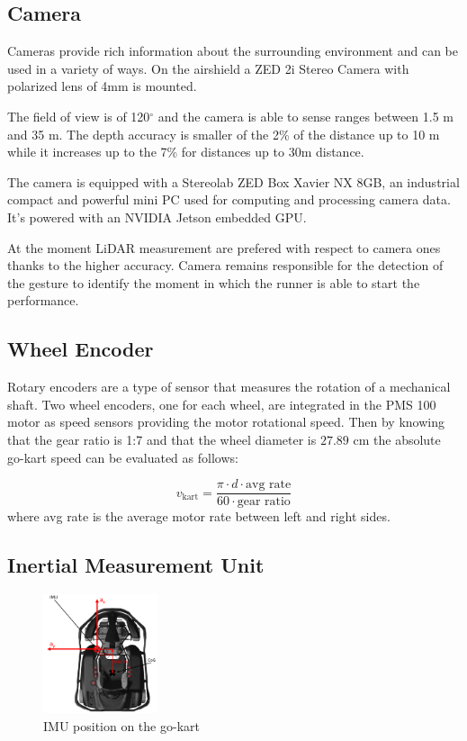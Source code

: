 \documentclass[a4paper,12pt,oneside]{book}
\begin{document}
\subsection*{Camera}
Cameras provide rich information about the surrounding environment and can be used in a variety of ways.
On the airshield a ZED 2i Stereo Camera with polarized lens of 4mm is mounted.

The field of view is of 120$^\circ$ and the camera is able to sense ranges between 1.5 m and 35 m. 
The depth accuracy is smaller of the 2\% of the distance up to 10 m while it increases up to the 7\% for distances up to 30m distance.

The camera is equipped with a Stereolab ZED Box Xavier NX 8GB, an industrial compact and powerful mini PC used for computing and processing camera data.
It's powered with an NVIDIA Jetson embedded GPU.

At the moment LiDAR measurement are prefered with respect to camera ones thanks to the higher accuracy.
Camera remains responsible for the detection of the gesture to identify the moment in which the runner is able to start the performance. 

\subsection*{Wheel Encoder}
Rotary encoders are a type of sensor that measures the rotation of a mechanical shaft.
Two wheel encoders, one for each wheel, are integrated in the PMS 100 motor as speed sensors providing the motor rotational speed.
Then by knowing that the gear ratio is 1:7 and that the wheel diameter is $27.89$ cm the absolute go-kart speed can be evaluated as follows:

\begin{equation}
    v_{\text{kart}} = \frac{\pi \cdot d \cdot \text{avg rate}}{60 \cdot \text{gear ratio}}
\end{equation}
where avg rate is the average motor rate between left and right sides.



\subsection*{Inertial Measurement Unit}

\begin{figure}[h!]
	\centering
	\includegraphics[width=0.3\textwidth]{IMU.png}
\caption{IMU position on the go-kart}
\label{IMU_pose}
\end{figure}
\end{document}
